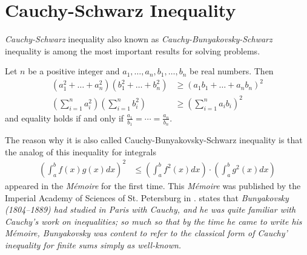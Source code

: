 \documentclass{subfile}
\begin{document}
	\section{Cauchy-Schwarz Inequality}\label{sec:cs}
	\emph{Cauchy-Schwarz} inequality also known as \emph{Cauchy-Bunyakovsky-Schwarz} inequality is among the most important results for solving problems.
		\begin{theorem}\label{thm:cs}
			Let $n$ be a positive integer and $a_1,\ldots,a_n,b_1,\ldots,b_n$ be real numbers. Then
				\begin{align}
					(a_1^2+\ldots+a_n^2)(b_1^2+\ldots+b_n^2)
						& \geq(a_1b_1+\ldots+a_nb_n)^2\label{ineq:cs}\\
					\left(\sum_{i=1}^na_i^2\right)\left(\sum_{i=1}^nb_i^2\right)
						& \geq\left(\sum_{i=1}^na_ib_i\right)^2\nonumber
				\end{align}
			and equality holds if and only if $\frac{a_1}{b_1}=\cdots=\frac{a_n}{b_n}$.
		\end{theorem}
	The reason why it is also called Cauchy-Bunyakovsky-Schwarz inequality is that the analog of this inequality for integrals
		\begin{align}
			\left(\int_{a}^{b}f(x)g(x)dx\right)^2
				& \leq\left(\int_{a}^{b}f^2(x)dx\right)\cdot\left(\int_{a}^{b}g^2(x)dx\right)\label{ineq:cbs}
		\end{align}
	appeared in the \emph{M\'{e}moire} \textcite[Page $4$]{bunyakovsky_1846} for the first time. This \emph{M\'{e}moire} was published by the Imperial Academy of Sciences of St. Petersburg in \textcite{bouniakowsky_1859}. \textcite[Page $10$]{steele_2010} states that \emph{Bunyakovsky (1804–1889) had studied in Paris with Cauchy, and he was quite familiar with Cauchy’s work on inequalities; so much so that by the time he came to write his M\'{e}moire, Bunyakovsky was content to refer to the classical form of Cauchy’ inequality for finite sums simply as well-known.}
	
\end{document}
